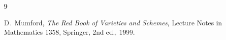 \documentclass[a4paper, 12pt]{article}
\theoremstyle{plain}
\theoremstyle{definition}
\begin{document}


\begin{thebibliography}{9}

  D.~Mumford,
  \emph{The Red Book of Varieties and Schemes},
  Lecture Notes in Mathematics 1358,
  Springer, 2nd ed., 1999.

\end{thebibliography}
\end{document}
